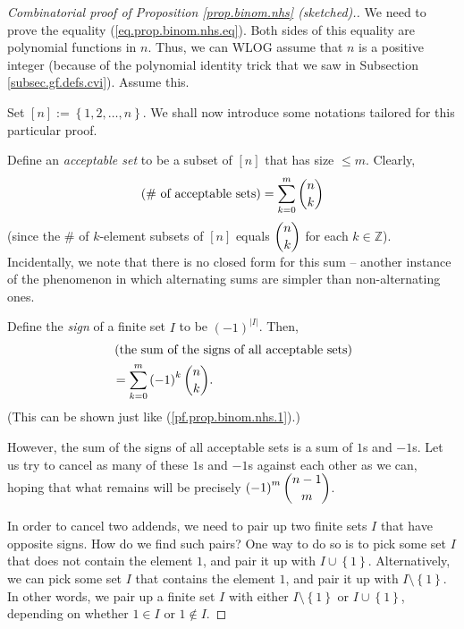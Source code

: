\begin{proof}
[Combinatorial proof of Proposition \ref{prop.binom.nhs} (sketched).]We need
to prove the equality (\ref{eq.prop.binom.nhs.eq}). Both sides of this
equality are polynomial functions in $n$. Thus, we can WLOG assume that $n$ is
a positive integer (because of the polynomial identity trick that we saw in
Subsection \ref{subsec.gf.defs.cvi}). Assume this.

Set $\left[  n\right]  :=\left\{  1,2,\ldots,n\right\}  $. We shall now
introduce some notations tailored for this particular proof.

Define an \emph{acceptable set} to be a subset of $\left[  n\right]  $ that
has size $\leq m$. Clearly,%
\begin{equation}
\left(  \text{\# of acceptable sets}\right)  =\sum_{k=0}^{m}\dbinom{n}{k}
\label{pf.prop.binom.nhs.1}%
\end{equation}
(since the \# of $k$-element subsets of $\left[  n\right]  $ equals
$\dbinom{n}{k}$ for each $k\in\mathbb{Z}$). Incidentally, we note that there
is no closed form for this sum -- another instance of the phenomenon in which
alternating sums are simpler than non-alternating ones.

Define the \emph{sign} of a finite set $I$ to be $\left(  -1\right)
^{\left\vert I\right\vert }$. Then,%
\begin{align}
&  \left(  \text{the sum of the signs of all acceptable sets}\right)
\nonumber\\
&  =\sum_{k=0}^{m}\left(  -1\right)  ^{k}\dbinom{n}{k}.
\label{pf.prop.binom.nhs.2}%
\end{align}
(This can be shown just like (\ref{pf.prop.binom.nhs.1}).)

However, the sum of the signs of all acceptable sets is a sum of $1$s and
$-1$s. Let us try to cancel as many of these $1$s and $-1$s against each other
as we can, hoping that what remains will be precisely $\left(  -1\right)
^{m}\dbinom{n-1}{m}$.

In order to cancel two addends, we need to pair up two finite sets $I$ that
have opposite signs. How do we find such pairs? One way to do so is to pick
some set $I$ that does not contain the element $1$, and pair it up with
$I\cup\left\{  1\right\}  $. Alternatively, we can pick some set $I$ that
contains the element $1$, and pair it up with $I\setminus\left\{  1\right\}
$. In other words, we pair up a finite set $I$ with either $I\setminus\left\{
1\right\}  $ or $I\cup\left\{  1\right\}  $, depending on whether $1\in I$ or
$1\notin I$.


\end{proof}
